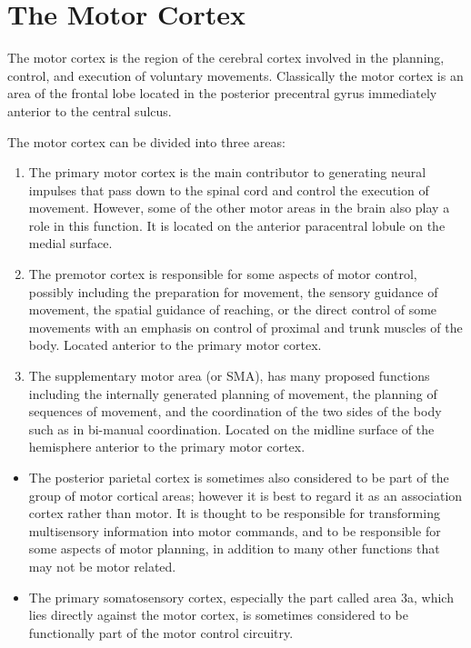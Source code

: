 \documentclass[]{book}
\providecommand{\tightlist}{%
  \setlength{\itemsep}{0pt}\setlength{\parskip}{0pt}}
\begin{document}
\hypertarget{the-motor-cortex}{%
\section{The Motor Cortex}\label{the-motor-cortex}}

The motor cortex is the region of the cerebral cortex involved in the planning, control, and execution of voluntary movements. Classically the motor cortex is an area of the frontal lobe located in the posterior precentral gyrus immediately anterior to the central sulcus.

The motor cortex can be divided into three areas:

\begin{enumerate}
\def\labelenumi{\arabic{enumi}.}
\tightlist
\item
  The primary motor cortex is the main contributor to generating neural impulses that pass down to the spinal cord and control the execution of movement. However, some of the other motor areas in the brain also play a role in this function. It is located on the anterior paracentral lobule on the medial surface.
\item
  The premotor cortex is responsible for some aspects of motor control, possibly including the preparation for movement, the sensory guidance of movement, the spatial guidance of reaching, or the direct control of some movements with an emphasis on control of proximal and trunk muscles of the body. Located anterior to the primary motor cortex.
\item
  The supplementary motor area (or SMA), has many proposed functions including the internally generated planning of movement, the planning of sequences of movement, and the coordination of the two sides of the body such as in bi-manual coordination. Located on the midline surface of the hemisphere anterior to the primary motor cortex.
\end{enumerate}

\begin{itemize}
\tightlist
\item
  The posterior parietal cortex is sometimes also considered to be part of the group of motor cortical areas; however it is best to regard it as an association cortex rather than motor. It is thought to be responsible for transforming multisensory information into motor commands, and to be responsible for some aspects of motor planning, in addition to many other functions that may not be motor related.
\item
  The primary somatosensory cortex, especially the part called area 3a, which lies directly against the motor cortex, is sometimes considered to be functionally part of the motor control circuitry.
\end{itemize}
\end{document}
